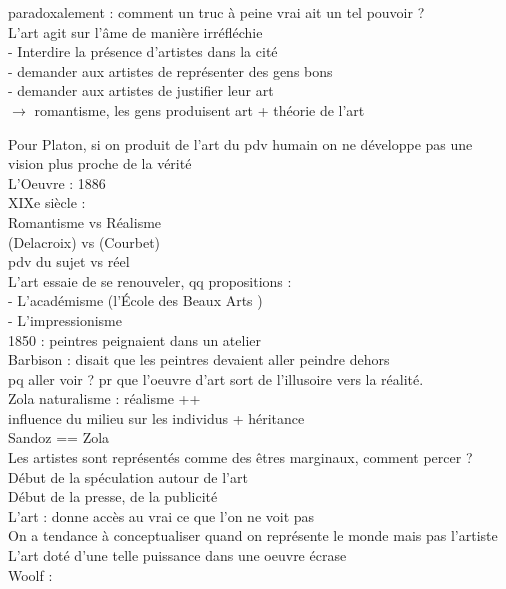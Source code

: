 \documentclass[a4paper,twocolumn,landscape]{article}
\begin{document}
paradoxalement : comment un truc à peine vrai ait un tel pouvoir ? \\
L'art agit sur l'âme de manière irréfléchie \\
- Interdire la présence d'artistes dans la cité \\
- demander aux artistes de représenter des gens bons\\
- demander aux artistes de justifier leur art \\
\(\to\) romantisme, les gens produisent art + théorie de l'art 

Pour Platon, si on produit de l'art du pdv humain on ne développe pas 
une vision plus proche de la vérité\\

\noindent
L'Oeuvre : 1886\\

\noindent
XIXe siècle : \\
Romantisme vs Réalisme \\
(Delacroix) vs (Courbet)\\
pdv du sujet vs réel \\

L'art essaie de se renouveler, qq propositions : \\
- L'académisme (l'École des Beaux Arts ) \\
- L'impressionisme \\
1850 : peintres peignaient dans un atelier \\
Barbison : disait que les peintres devaient aller peindre dehors\\
pq aller voir ? pr que l'oeuvre d'art sort de l'illusoire vers 
la réalité.\\
Zola naturalisme : réalisme ++ \\
influence du milieu sur les individus + héritance \\
Sandoz == Zola \\
Les artistes sont représentés comme des êtres marginaux, comment percer ? \\
Début de la spéculation autour de l'art\\
Début de la presse, de la publicité \\
L'art : donne accès au vrai ce que l'on ne voit pas \\
On a tendance à conceptualiser quand on représente le monde mais pas l'artiste\\
L'art doté d'une telle puissance dans une oeuvre écrase\\

\noindent
Woolf : \\
\end{document}
